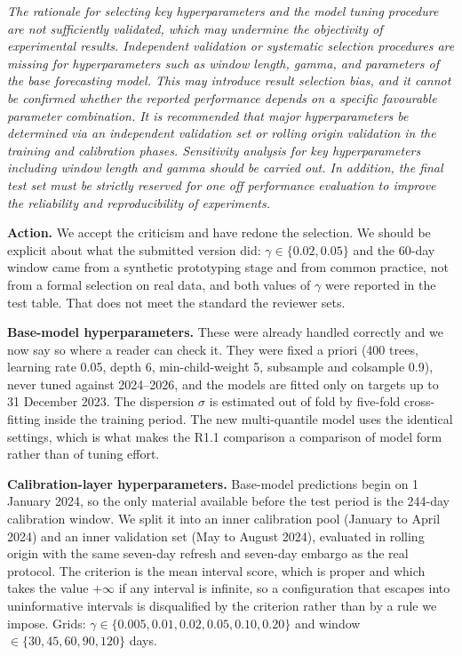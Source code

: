 \documentclass[11pt,a4paper]{article}
\newenvironment{revcomment}
  {\begin{mdframed}[backgroundcolor=quotebg,linecolor=quoterule,linewidth=0.4pt,
    innertopmargin=6pt,innerbottommargin=6pt,skipabove=8pt,skipbelow=8pt]\itshape}
  {\end{mdframed}}
\newcommand{\action}[1]{\textbf{Action.} #1}
\begin{document}
\begin{revcomment}
The rationale for selecting key hyperparameters and the model tuning procedure are not sufficiently validated, which may undermine the objectivity of experimental results. Independent validation or systematic selection procedures are missing for hyperparameters such as window length, gamma, and parameters of the base forecasting model. This may introduce result selection bias, and it cannot be confirmed whether the reported performance depends on a specific favourable parameter combination. It is recommended that major hyperparameters be determined via an independent validation set or rolling origin validation in the training and calibration phases. Sensitivity analysis for key hyperparameters including window length and gamma should be carried out. In addition, the final test set must be strictly reserved for one off performance evaluation to improve the reliability and reproducibility of experiments.
\end{revcomment}

\action{We accept the criticism and have redone the selection. We should be explicit about what the submitted version did: $\gamma\in\{0.02,0.05\}$ and the 60-day window came from a synthetic prototyping stage and from common practice, not from a formal selection on real data, and both values of $\gamma$ were reported in the test table. That does not meet the standard the reviewer sets.}

\textbf{Base-model hyperparameters.} These were already handled correctly and we now say so where a reader can check it. They were fixed a priori (400 trees, learning rate 0.05, depth 6, min-child-weight 5, subsample and colsample 0.9), never tuned against 2024--2026, and the models are fitted only on targets up to 31 December 2023. The dispersion $\sigma$ is estimated out of fold by five-fold cross-fitting inside the training period. The new multi-quantile model uses the identical settings, which is what makes the R1.1 comparison a comparison of model form rather than of tuning effort.

\textbf{Calibration-layer hyperparameters.} Base-model predictions begin on 1 January 2024, so the only material available before the test period is the 244-day calibration window. We split it into an inner calibration pool (January to April 2024) and an inner validation set (May to August 2024), evaluated in rolling origin with the same seven-day refresh and seven-day embargo as the real protocol. The criterion is the mean interval score, which is proper and which takes the value $+\infty$ if any interval is infinite, so a configuration that escapes into uninformative intervals is disqualified by the criterion rather than by a rule we impose. Grids: $\gamma\in\{0.005,0.01,0.02,0.05,0.10,0.20\}$ and window $\in\{30,45,60,90,120\}$ days.
\end{document}

